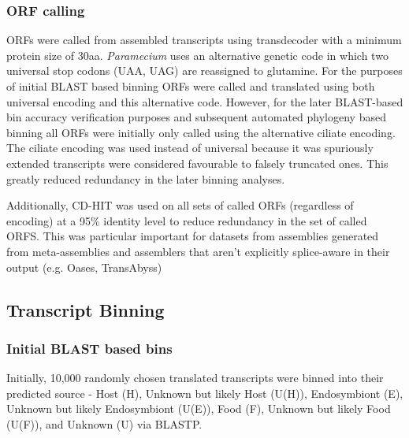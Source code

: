 \subsubsection{ORF calling}

ORFs were called from assembled transcripts using transdecoder \citep{Haas2013} with 
a minimum protein size of 30aa.  \textit{Paramecium} uses an alternative
genetic code in which two universal stop codons (UAA, UAG) are reassigned to glutamine.
For the purposes of initial BLAST based binning ORFs were called and translated
using both universal encoding and this alternative code. However, for 
the later BLAST-based bin accuracy verification purposes and subsequent
automated phylogeny based binning all ORFs were initially only called using 
the alternative ciliate encoding. The ciliate encoding was used
instead of universal because it was spuriously extended transcripts
were considered favourable to falsely truncated ones.
This greatly reduced redundancy in the later binning analyses.

Additionally, CD-HIT \citep{Li2006} was used on all sets of called ORFs (regardless of encoding) 
at a 95\% identity level to reduce redundancy in the set of called ORFS.
This was particular important for datasets from assemblies generated from
meta-assemblies and assemblers that aren't explicitly splice-aware in their output
(e.g. Oases, TransAbyss)

\subsection{Transcript Binning}

\subsubsection{Initial BLAST based bins}

Initially, 10,000 randomly chosen translated transcripts were binned into their predicted source - 
Host (H), Unknown but likely Host (U(H)), Endosymbiont (E), Unknown but likely Endosymbiont (U(E)), Food (F), Unknown but likely Food (U(F)), and
Unknown (U) via BLASTP. 

